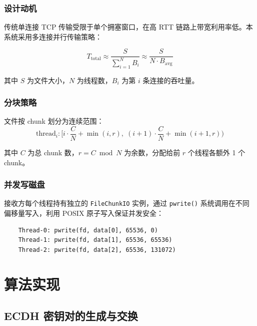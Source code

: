 \documentclass[12pt]{article}
\begin{document}
\subsubsection{设计动机}

传统单连接 TCP 传输受限于单个拥塞窗口，在高 RTT 链路上带宽利用率低。本系统采用多连接并行传输策略：

\begin{equation}
T_{\text{total}} \approx \frac{S}{\sum_{i=1}^{N} B_i} \approx \frac{S}{N \cdot B_{\text{avg}}}
\end{equation}

其中 $S$ 为文件大小，$N$ 为线程数，$B_i$ 为第 $i$ 条连接的吞吐量。

\subsubsection{分块策略}

文件按 chunk 划分为连续范围：
\begin{equation}
\text{thread}_i: [i \cdot \frac{C}{N} + \min(i, r),\; (i+1) \cdot \frac{C}{N} + \min(i+1, r))
\end{equation}

其中 $C$ 为总 chunk 数，$r = C \bmod N$ 为余数，分配给前 $r$ 个线程各额外 1 个 chunk。

\subsubsection{并发写磁盘}

接收方每个线程持有独立的 \texttt{FileChunkIO} 实例，通过 \texttt{pwrite()} 系统调用在不同偏移量写入，利用 POSIX 原子写入保证并发安全：

\begin{verbatim}
    Thread-0: pwrite(fd, data[0], 65536, 0)
    Thread-1: pwrite(fd, data[1], 65536, 65536)
    Thread-2: pwrite(fd, data[2], 65536, 131072)
\end{verbatim}

\newpage

\section{算法实现}

\subsection{ECDH 密钥对的生成与交换}
\end{document}
